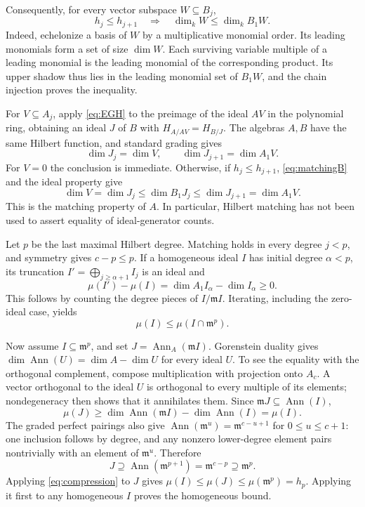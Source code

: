 \documentclass[11pt]{article}
\DeclareMathOperator{\Ann}{Ann}
\newcommand{\m}{\mathfrak m}
\begin{document}
Consequently, for every vector subspace \(W\subseteq B_j\),
\begin{equation}\label{eq:matchingB}
 h_j\le h_{j+1}\quad\Longrightarrow\quad
 \dim_k W\le\dim_k B_1W.
\end{equation}
Indeed, echelonize a basis of \(W\) by a multiplicative monomial order.
Its leading monomials form a set of size \(\dim W\). Each surviving
variable multiple of a leading monomial is the leading monomial of the
corresponding product. Its upper shadow thus lies in the leading
monomial set of \(B_1W\), and the chain injection proves the inequality.

For \(V\subseteq A_j\), apply \eqref{eq:EGH} to the preimage of
the ideal \(AV\) in the polynomial ring, obtaining an ideal \(J\) of
\(B\) with \(H_{A/AV}=H_{B/J}\). The algebras \(A,B\) have the same
Hilbert function, and standard grading gives
\[
 \dim J_j=\dim V,\qquad \dim J_{j+1}=\dim A_1V.
\]
For \(V=0\) the conclusion is immediate. Otherwise, if
\(h_j\le h_{j+1}\), \eqref{eq:matchingB} and the ideal property give
\begin{equation}\label{eq:matchingA}
 \dim V=\dim J_j\le\dim B_1J_j\le\dim J_{j+1}=\dim A_1V.
\end{equation}
This is the matching property of \(A\). In particular, Hilbert matching
has not been used to assert equality of ideal-generator counts.

Let \(p\) be the last maximal Hilbert degree. Matching holds in every
degree \(j<p\), and symmetry gives \(c-p\le p\). If a homogeneous
ideal \(I\) has initial degree \(\alpha<p\), its truncation
\(I'=\bigoplus_{j\ge\alpha+1}I_j\) is an ideal and
\begin{equation}\label{eq:truncate}
 \mu(I')-\mu(I)=\dim A_1I_\alpha-\dim I_\alpha\ge0.
\end{equation}
This follows by counting the degree pieces of \(I/\m I\).
Iterating, including the zero-ideal case, yields
\begin{equation}\label{eq:compression}
 \mu(I)\le\mu(I\cap\m^p).
\end{equation}

Now assume \(I\subseteq\m^p\), and set \(J=\Ann_A(\m I)\).
Gorenstein duality gives
\(\dim\Ann(U)=\dim A-\dim U\) for every ideal \(U\).
To see the equality with the orthogonal complement, compose
multiplication with projection onto \(A_c\). A vector orthogonal to
the ideal \(U\) is orthogonal to every multiple of its elements;
nondegeneracy then shows that it annihilates them.
Since \(\m J\subseteq\Ann(I)\),
\begin{equation}\label{eq:annmu}
 \mu(J)\ge\dim\Ann(\m I)-\dim\Ann(I)=\mu(I).
\end{equation}
The graded perfect pairings also give
\(\Ann(\m^u)=\m^{c-u+1}\) for \(0\le u\le c+1\):
one inclusion follows by degree, and any nonzero lower-degree element
pairs nontrivially with an element of \(\m^u\).
Therefore
\[
 J\supseteq\Ann(\m^{p+1})=\m^{c-p}\supseteq\m^p.
\]
Applying \eqref{eq:compression} to \(J\) gives
\(\mu(I)\le\mu(J)\le\mu(\m^p)=h_p\).
Applying it first to any homogeneous \(I\) proves the homogeneous bound.
\end{document}
